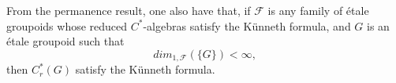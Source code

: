 From the permanence result, one also have that, if $\mathcal F$ is any family of \'etale groupoids whose reduced $C^*$-algebras satisfy the Künneth formula, and $G$ is an \'etale groupoid such that \[dim_{1, \mathcal F} ( \{G\} ) < \infty, \]
then $C_r^*(G)$ satisfy the Künneth formula.
































